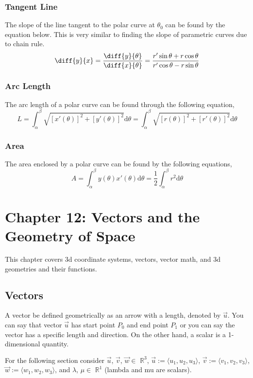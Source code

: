 \documentclass{article}
\begin{document}
\subsubsection{Tangent Line}
The slope of the line tangent to the polar curve at $\theta_0$ can be found by the equation below. This is very similar to finding the slope of parametric curves due to chain rule.  
$$\diff{y}{x} = \frac{\diff{y}{\theta}}{\diff{x}{\theta}} =\frac{r'\sin{\theta}+r\cos{\theta}}{r'\cos{\theta}-r\sin{\theta}}$$

\subsubsection{Arc Length}
The arc length of a polar curve can be found through the following equation,
$$L=\int_{\alpha}^{\beta}{\sqrt{[x'(\theta)]^2+[y'(\theta)]^2}}\text{d}\theta=\int_{\alpha}^{\beta}{\sqrt{[r(\theta)]^2+[r'(\theta)]^2}}\text{d}\theta$$

\subsubsection{Area}
The area enclosed by a polar curve can be found by the following equations,
$$A = \int_{\alpha}^{\beta}{y(\theta)x'(\theta)\text{d}\theta} = \frac{1}{2} \int_{\alpha}^{\beta}{r^2}\text{d}\theta$$




\section{Chapter 12: Vectors and the Geometry of Space}
This chapter covers 3d coordinate systems, vectors, vector math, and 3d geometries and their functions. 

\subsection{Vectors}
A vector be defined geometrically as an arrow with a length, denoted by $\vec{u}$. You can say that vector $\vec{u}$ has start point $P_0$ and end point $P_1$ or you can say the vector has a specific length and direction. On the other hand, a scalar is a 1-dimensional quantity. 

For the following section consider $\vec{u}$, $\vec{v}$, $\vec{w} \in$ $\mathbb{R}^3$, $\vec{u} := \langle u_1, u_2, u_3 \rangle$, $\vec{v} := \langle v_1, v_2, v_3 \rangle$, $\vec{w} := \langle w_1, w_2, w_3 \rangle$, and $\lambda$, $\mu \in$ $\mathbb{R}^1$ (lambda and mu are scalars). 
\end{document}
